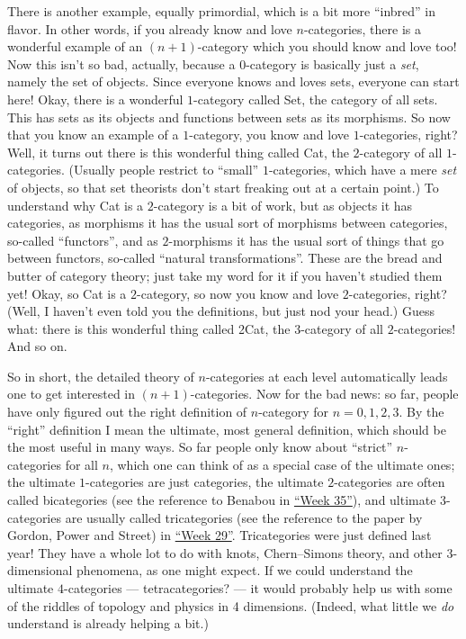 \documentclass[12pt]{article}
\begin{document}
There is another example, equally primordial, which is a bit more
``inbred'' in flavor. In other words, if you already know and love
\(n\)-categories, there is a wonderful example of an \((n+1)\)-category
which you should know and love too! Now this isn't so bad, actually,
because a 0-category is basically just a \emph{set}, namely the set of
objects. Since everyone knows and loves sets, everyone can start here!
Okay, there is a wonderful \(1\)-category called Set, the category of
all sets. This has sets as its objects and functions between sets as its
morphisms. So now that you know an example of a \(1\)-category, you know
and love \(1\)-categories, right? Well, it turns out there is this
wonderful thing called Cat, the \(2\)-category of all \(1\)-categories.
(Usually people restrict to ``small'' \(1\)-categories, which have a
mere \emph{set} of objects, so that set theorists don't start freaking
out at a certain point.) To understand why Cat is a \(2\)-category is a
bit of work, but as objects it has categories, as morphisms it has the
usual sort of morphisms between categories, so-called ``functors'', and
as \(2\)-morphisms it has the usual sort of things that go between
functors, so-called ``natural transformations''. These are the bread and
butter of category theory; just take my word for it if you haven't
studied them yet! Okay, so Cat is a \(2\)-category, so now you know and
love \(2\)-categories, right? (Well, I haven't even told you the
definitions, but just nod your head.) Guess what: there is this
wonderful thing called 2Cat, the \(3\)-category of all \(2\)-categories!
And so on.

So in short, the detailed theory of \(n\)-categories at each level
automatically leads one to get interested in \((n+1)\)-categories. Now
for the bad news: so far, people have only figured out the right
definition of \(n\)-category for \(n = 0, 1, 2, 3\). By the ``right''
definition I mean the ultimate, most general definition, which should be
the most useful in many ways. So far people only know about ``strict''
\(n\)-categories for all \(n\), which one can think of as a special case
of the ultimate ones; the ultimate \(1\)-categories are just categories,
the ultimate \(2\)-categories are often called bicategories (see the
reference to Benabou in \protect\hyperlink{week35}{``Week 35''}), and
ultimate \(3\)-categories are usually called tricategories (see the
reference to the paper by Gordon, Power and Street) in
\protect\hyperlink{week29}{``Week 29''}. Tricategories were just defined
last year! They have a whole lot to do with knots, Chern--Simons theory,
and other \(3\)-dimensional phenomena, as one might expect. If we could
understand the ultimate \(4\)-categories --- tetracategories? --- it
would probably help us with some of the riddles of topology and physics
in 4 dimensions. (Indeed, what little we \emph{do} understand is already
helping a bit.)
\end{document}
